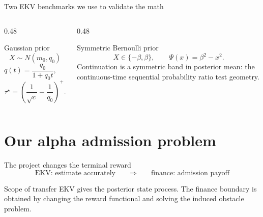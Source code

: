 \documentclass[aspectratio=169,10pt]{beamer}
\newcommand{\wt}{\widetilde}
\newcommand{\1}{\mathbf{1}}
\begin{document}
\begin{frame}{Two EKV benchmarks we use to validate the math}
  \begin{columns}[T,onlytextwidth]
    \begin{column}{0.48\textwidth}
      \begin{block}{Gaussian prior}
        \[
          X\sim N(m_0,q_0)
        \]
        \[
          q(t)=\frac{q_0}{1+q_0t},
          \qquad
          dm_t=q(t)\,d\wt W_t .
        \]
        \[
          \tau^\star=\left(\frac{1}{\sqrt c}-\frac{1}{q_0}\right)^+ .
        \]
      \end{block}
    \end{column}
    \begin{column}{0.48\textwidth}
      \begin{block}{Symmetric Bernoulli prior}
        \[
          X\in\{-\beta,\beta\},
          \qquad
          \Psi(x)=\beta^2-x^2 .
        \]
        Continuation is a symmetric band in posterior mean: the continuous-time
        sequential probability ratio test geometry.
      \end{block}
    \end{column}
  \end{columns}
\end{frame}

\section{Our alpha admission problem}

\begin{frame}{The project changes the terminal reward}
  \large
  \[
    \text{EKV: estimate accurately}
    \qquad
    \Longrightarrow
    \qquad
    \text{finance: admission payoff}
  \]

  \vspace{1.0em}

  \normalsize
  \begin{block}{Scope of transfer}
    EKV gives the posterior state process. The finance boundary is obtained by changing
    the reward functional and solving the induced obstacle problem.
  \end{block}
\end{frame}
\end{document}
